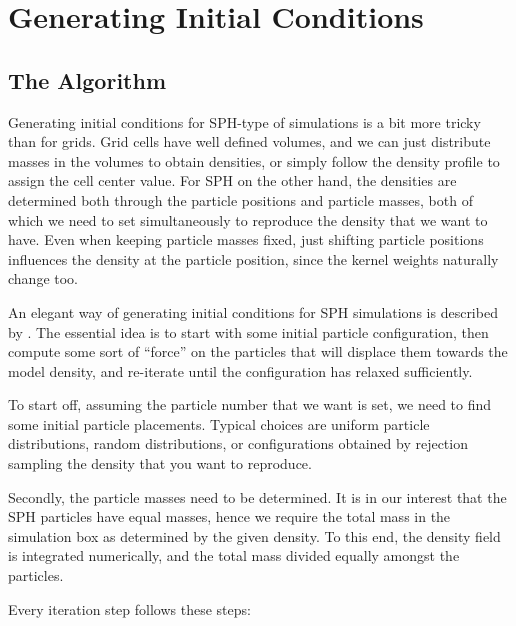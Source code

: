\newpage
\section{Generating Initial Conditions}\label{chap:IC}



\subsection{The Algorithm}


Generating initial conditions for SPH-type of simulations is a bit more tricky than for grids.
Grid cells have well defined volumes, and we can just distribute masses in the volumes to obtain densities, or simply follow the density profile to assign the cell center value.
For SPH on the other hand, the densities are determined both through the particle positions and particle masses, both of which we need to set simultaneously to reproduce the density that we want to have.
Even when keeping particle masses fixed, just shifting particle positions influences the density at the particle position, since the kernel weights naturally change too.

An elegant way of generating initial conditions for SPH simulations is described by \cite{arthWVTICsSPHInitial2019}.
The essential idea is to start with some initial particle configuration, then compute some sort of ``force'' on the particles that will displace them towards the model density, and re-iterate until the configuration has relaxed sufficiently.


To start off, assuming the particle number that we want is set, we need to find some initial particle placements.
Typical choices are uniform particle distributions, random distributions, or configurations obtained by rejection sampling the density that you want to reproduce.

Secondly, the particle masses need to be determined.
It is in our interest that the SPH particles have equal masses, hence we require the total mass in the simulation box as determined by the given density.
To this end, the density field is integrated numerically, and the total mass divided equally amongst the particles.


Every iteration step follows these steps:

